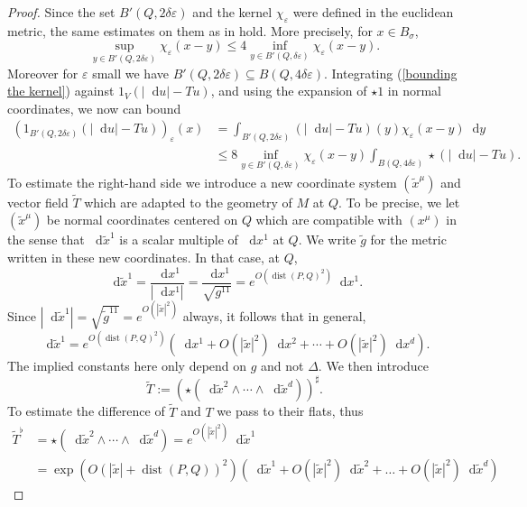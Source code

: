 \documentclass[reqno,12pt,letterpaper]{amsart}
\newcommand*\dif{\mathop{}\!\mathrm{d}}
\DeclareMathOperator{\dist}{dist}
\theoremstyle{definition}
\numberwithin{equation}{section}
\begin{document}
\begin{proof}
Since the set $B'(Q, 2\delta\varepsilon)$ and the kernel $\chi_\varepsilon$ were defined in the euclidean metric, the same estimates on them as in \cite[Theorem 7.3]{Giusti77} hold. More precisely, for $x \in B_\sigma$,
\begin{equation}\label{bounding the kernel}
\sup_{y \in B'(Q, 2\delta\varepsilon)} \chi_\varepsilon(x - y) \leq 4 \inf_{y \in B'(Q, \delta\varepsilon)} \chi_\varepsilon(x - y).
\end{equation}
Moreover for $\varepsilon$ small we have $B'(Q, 2\delta\varepsilon) \subseteq B(Q, 4\delta\varepsilon)$.
Integrating (\ref{bounding the kernel}) against $1_V(|\dif u| - Tu)$, and using the expansion of $\star 1$ in normal coordinates, we now can bound
\begin{align*}
(1_{B'(Q, 2\delta\varepsilon)}(|\dif u| - Tu))_\varepsilon(x) &= \int_{B'(Q, 2\delta\varepsilon)} (|\dif u| - Tu)(y) \chi_\varepsilon(x - y) \dif y \\
&\leq 8 \inf_{y \in B'(Q, \delta\varepsilon)} \chi_\varepsilon(x - y) \int_{B(Q, 4\delta\varepsilon)} \star (|\dif u| - Tu).
\end{align*}
To estimate the right-hand side we introduce a new coordinate system $(\tilde x^\mu)$ and vector field $\tilde T$ which are adapted to the geometry of $M$ at $Q$.
To be precise, we let $(\tilde x^\mu)$ be normal coordinates centered on $Q$ which are compatible with $(x^\mu)$ in the sense that $\dif \tilde x^1$ is a scalar multiple of $\dif x^1$ at $Q$.
We write $\tilde g$ for the metric written in these new coordinates.
In that case, at $Q$,
$$\dif \tilde x^1 = \frac{\dif x^1}{|\dif x^1|} = \frac{\dif x^1}{\sqrt{g^{11}}} = e^{O(\dist(P, Q)^2)} \dif x^1.$$
Since $|\dif \tilde x^1| = \sqrt{\tilde g^{11}} = e^{O(|\tilde x|^2)}$ always, it follows that in general,
$$\dif \tilde x^1 = e^{O(\dist(P, Q)^2)}\left(\dif x^1 + O(|\tilde x|^2) \dif x^2 + \cdots + O(|\tilde x|^2) \dif x^d\right).$$
The implied constants here only depend on $g$ and not $\Delta$.
We then introduce
$$\tilde T := (\star (\dif \tilde x^2 \wedge \cdots \wedge \dif \tilde x^d))^\sharp.$$
To estimate the difference of $\tilde T$ and $T$ we pass to their flats, thus
\begin{align*}
\tilde T^\flat &= \star(\dif \tilde x^2 \wedge \cdots \wedge \dif \tilde x^d) = e^{O(|\tilde x|^2)} \dif \tilde x^1 \\
&= \exp\left(O(|\tilde x| + \dist(P, Q))^2\right) \left(\dif \tilde x^1 + O(|\tilde x|^2) \dif \tilde x^2 + \dots + O(|\tilde x|^2) \dif \tilde x^d\right)

\end{align*}
\end{proof}
\end{document}

